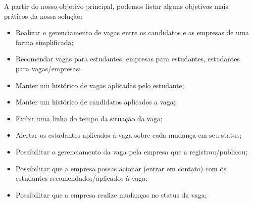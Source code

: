 A partir do nosso objetivo principal, podemos listar alguns objetivos mais práticos da nossa solução:

\begin{itemize}
	\item Realizar o gerenciamento de vagas entre os candidatos e as empresas de uma forma simplificada;
	\item Recomendar vagas para estudantes, empresas para estudantes, estudantes para vagas/empresas;
	\item Manter um histórico de vagas aplicadas pelo estudante;
	\item Manter um histórico de candidatos aplicados a vaga;
	\item Exibir uma linha do tempo da situação da vaga;
	\item Alertar os estudantes aplicados à vaga sobre cada mudança em seu status;
	\item Possibilitar o gerenciamento da vaga pela empresa que a registrou/publicou;
	\item Possibilitar que a empresa possas acionar (entrar em contato) com os estudantes recomendados/aplicados à vaga;
	\item Possibilitar que a empresa realize mudanças no status da vaga;
\end{itemize}
	
